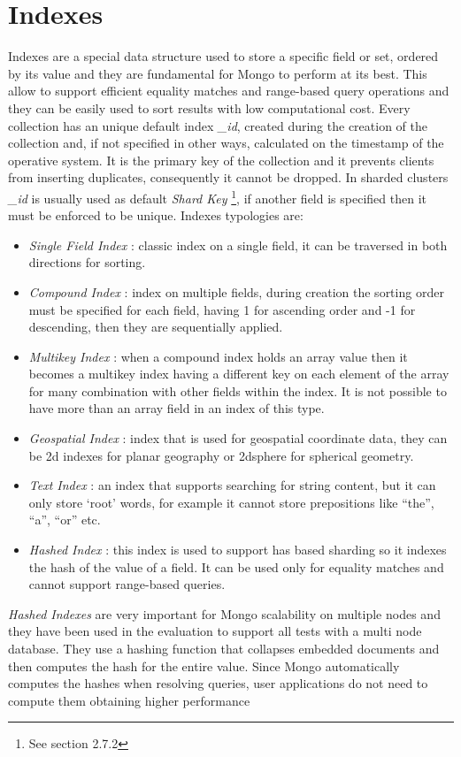 \section{Indexes}
\label{sec:3}
Indexes are a special data structure used to store a specific field or set, ordered by its value and they are fundamental for Mongo to perform at its best. This allow to support efficient equality matches and range-based query operations and they can be easily used to sort results with low computational cost.
Every collection has an unique default index \textit{\_id}, created during the creation of the collection and, if not specified in other ways, calculated on the timestamp of the operative system. It is the primary key of the collection and it prevents clients from inserting duplicates, consequently it cannot be dropped. 
In sharded clusters \textit{\_id} is usually used as default \textit{Shard Key} \footnote{See section 2.7.2}, if another field is specified then it must be enforced to be unique.
Indexes typologies are:
\begin{itemize}
	\item \textit{Single Field Index} : classic index on a single field, it can be traversed in both directions for sorting.
	\item \textit{Compound Index} : index on multiple fields, during creation the sorting order must be specified for each field, having 1 for ascending order and  -1 for descending, then they are sequentially applied.
	\item \textit{Multikey Index} : when a compound index holds an array value then it becomes a multikey index having a different key on each element of the array for many combination with other fields within the index. It is not possible to have more than an array field in an index of this type.
	\item \textit{Geospatial Index} : index that is used for geospatial coordinate data, they can be 2d indexes for planar geography or 2dsphere for spherical geometry.
	\item \textit{Text Index} : an index that supports searching for string content, but it can only store ‘root’ words, for example it cannot store prepositions like “the”, “a”, “or” etc.
	\item \textit{Hashed Index} : this index is used to support has based sharding so it indexes the hash of the value of a field. It can be used only for equality matches and cannot support range-based queries.
\end{itemize}
\textit{Hashed Indexes} are very important for Mongo scalability on multiple nodes 
and they have been used in the evaluation to support all tests with a multi node database. They use a hashing function that collapses embedded documents and then computes the hash for the entire value.
Since Mongo automatically computes the hashes when resolving queries, user applications do not need to compute them obtaining higher performance

